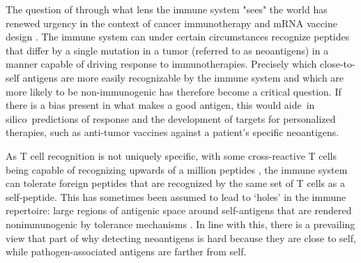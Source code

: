 \documentclass[superscriptaddress,twocolumn,pre]{revtex4}
\newcommand{\<}{\langle}
\renewcommand{\>}{\rangle}
\begin{document}
The question of through what lens the immune system "sees" the world has renewed urgency in the context of cancer immunotherapy and mRNA vaccine design \cite{Luksza2017,Balachandran2017,Richman2019}. The immune system can under certain circumstances recognize peptides that differ by a single mutation in a tumor (referred to as neoantigens) in a manner capable of driving response to immunotherapies. Precisely which close-to-self antigens are more easily recognizable by the immune system and which are more likely to be non-immunogenic has therefore become a critical question. If there is a bias present in what makes a good antigen, this would aide in silico predictions of response and the development of targets for personalized therapies, such as anti-tumor vaccines against a patient's specific neoantigens.

As T cell recognition is not uniquely specific, with some cross-reactive T cells being capable of recognizing upwards of a million peptides \cite{Woolridge2012}, the immune system can tolerate foreign peptides that are recognized by the same set of T cells as a self-peptide. This has sometimes been assumed to lead to ‘holes’ in the immune repertoire: large regions of antigenic space around self-antigens that are rendered nonimmunogenic by tolerance mechanisms \cite{Calis2012a}. In line with this, there is a prevailing view that part of why detecting neoantigens is hard because they are close to self, while pathogen-associated antigens are farther from self.
\end{document}
